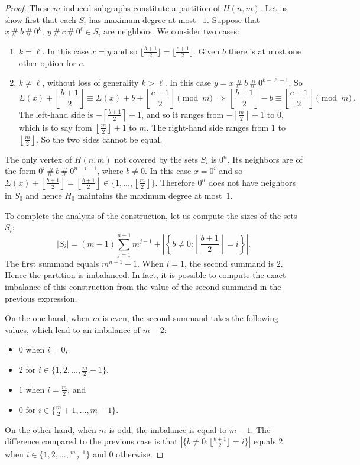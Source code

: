 \documentclass[10pt,a4paper]{amsart}
\begin{document}
\begin{proof}
    
    These $m$ induced subgraphs constitute a partition of $H(n,m)$. 
Let us show first that each $S_i$ has maximum degree at most ~$1$. Suppose that $x\ \#\ b\ \#\ 0^k,\ y\ \#\ c\ \#\ 0^\ell \in S_i$ are neighbors. We consider two cases:
\begin{enumerate}
    \item $k = \ell$. In this case $x = y$ and so $\lfloor \frac{b+1}{2} \rfloor = \lfloor \frac{c+1}{2} \rfloor$. Given $b$ there is at most one other option for $c$.
    \item $k \neq \ell$, without loss of generality $k > \ell$. In this case $y= x \ \#\ b \ \#\ 0^{k-\ell-1}$. So
    \[
     \Sigma(x) + \left\lfloor \frac{b+1}{2} \right\rfloor \equiv \Sigma(x) + b + \left\lfloor \frac{c+1}{2} \right\rfloor \pmod{m} \ \Rightarrow\ 
     \left\lfloor \frac{b+1}{2} \right\rfloor - b \equiv \left\lfloor \frac{c+1}{2} \right\rfloor \pmod{m}\ .
    \]
    The left-hand side is $-\left\lceil \frac{b+1}{2} \right\rceil+1$, and so it ranges from $-\left\lceil \frac{m}{2}\right\rceil +1$ to $0$, which is to say from $\left\lfloor \frac{m}{2} \right\rfloor + 1$ to $m$.
    The right-hand side ranges from $1$ to $\left\lfloor\frac{m}{2} \right\rfloor$.
    So the two sides cannot be equal.
\end{enumerate}
The only vertex of $H(n,m)$ not covered by the sets $S_i$ is $0^n$. Its neighbors are of the form $0^i \ \#\ b \ \#\ 0^{n-i-1}$, where $b \neq 0$. In this case $x = 0^i$ and so $\Sigma(x) + \left\lfloor \frac{b+1}{2} \right\rfloor = \left\lfloor \frac{b+1}{2} \right\rfloor \in \{1, \ldots, \left\lfloor \frac{m}{2} \right\rfloor\}$. Therefore $0^n$ does not have neighbors in $S_0$ and hence $H_0$ maintains the maximum degree at most~$1$.

To complete the analysis of the construction, let us compute the sizes of the sets $S_i$:
\[
 |S_i| = (m-1)\sum_{j=1}^{n-1} m^{j-1} + \left|\left\{ b \neq 0 : \left\lfloor \frac{b+1}{2} \right\rfloor = i\right\}\right|.
\]
The first summand equals $m^{n-1} - 1$. When $i = 1$, the second summand is $2$. Hence the partition is imbalanced. In fact, it is possible to compute the exact imbalance of this construction from the value of the second summand in the previous expression.

On the one hand, when $m$ is even, the second summand takes the following values, which lead to an imbalance of $m-2$:

\begin{itemize}
    \item $0$ when $i=0$,
    \item $2$ for $i\in\{1,2,\dots,\frac{m}{2}-1\}$,
    \item $1$ when $i=\frac{m}{2}$, and
    \item $0$ for $i\in\{\frac{m}{2}+1,\dots,m-1\}$.
\end{itemize}

On the other hand, when $m$ is odd, the imbalance is equal to $m-1$. The difference compared to the previous case is that $|\{b\neq 0 : \lfloor\frac{b+1}{2}\rfloor=i\}|$ equals $2$ when $i\in\{1,2,\dots,\frac{m-1}{2}\}$ and $0$ otherwise.\end{proof}
\end{document}
